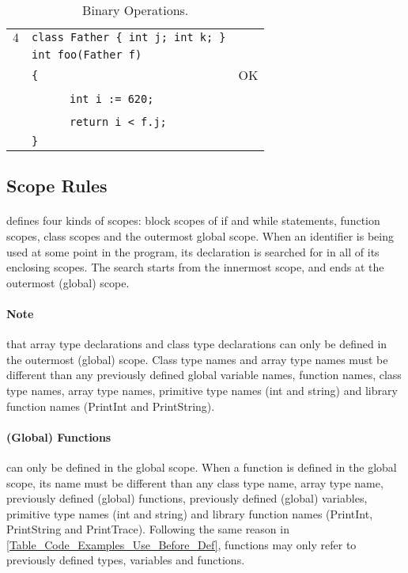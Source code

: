 \documentclass{article}
\begin{document}
\begin{table}[h]
\begin{tabular}{|l|l|l|}
\hline
 $4$ & \verb"class Father { int j; int k; }" &    \\
     & \verb"int foo(Father f)"              &    \\
     & \verb"{"                              & OK \\
     & ~ ~ ~ ~\verb"int i := 620;"           &    \\
     & ~ ~ ~ ~\verb"return i < f.j;"         &    \\
     & \verb"}"                              &    \\
\hline
\end{tabular}
\caption{Binary Operations.
\label{Table_Code_Examples_Binary_Operations}}
\end{table}
\subsection{Scope Rules}
\label{subsection_Scope_Rules}
\paragraph{\plname} defines four kinds of scopes:
block scopes of if and while statements,
function scopes,
class scopes and
the outermost global scope.
When an identifier is being used at some point in the program,
its declaration is searched for in all of its enclosing scopes.
The search starts from the innermost scope, 
and ends at the outermost (global) scope.
\paragraph{Note} that array type declarations and
class type declarations can only be defined
in the outermost (global) scope.
Class type names and array type names must be different than any
previously defined global variable names, function names, class type names,
array type names, primitive type names (int and string) and library function names
(PrintInt and PrintString).
\paragraph{(Global) Functions} can only be defined in the global scope.
When a function is defined in the global scope, its name must be different than
any class type name, array type name, previously defined (global) functions,
previously defined (global) variables,
primitive type names (int and string) and library function names (PrintInt, PrintString and PrintTrace).
Following the same reason in \ref{Table_Code_Examples_Use_Before_Def},
functions may only refer to previously defined types, variables and functions.
\end{document}
